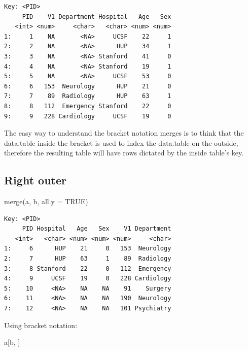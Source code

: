 \documentclass[
]{book}
\newenvironment{Shaded}{\begin{snugshade}}{\end{snugshade}}
\newcommand{\AttributeTok}[1]{\textcolor[rgb]{0.77,0.63,0.00}{#1}}
\newcommand{\ConstantTok}[1]{\textcolor[rgb]{0.00,0.00,0.00}{#1}}
\newcommand{\FunctionTok}[1]{\textcolor[rgb]{0.00,0.00,0.00}{#1}}
\newcommand{\NormalTok}[1]{#1}
\begin{document}
\begin{verbatim}
Key: <PID>
     PID    V1 Department Hospital   Age   Sex
   <int> <num>     <char>   <char> <num> <num>
1:     1    NA       <NA>     UCSF    22     1
2:     2    NA       <NA>      HUP    34     1
3:     3    NA       <NA> Stanford    41     0
4:     4    NA       <NA> Stanford    19     1
5:     5    NA       <NA>     UCSF    53     0
6:     6   153  Neurology      HUP    21     0
7:     7    89  Radiology      HUP    63     1
8:     8   112  Emergency Stanford    22     0
9:     9   228 Cardiology     UCSF    19     0
\end{verbatim}

\begin{rmdnote}
The easy way to understand the bracket notation merges is to think that
the data.table inside the bracket is used to index the data.table on the
outside, therefore the resulting table will have rows dictated by the
inside table's key.
\end{rmdnote}

\hypertarget{right-outer}{%
\subsection{Right outer}\label{right-outer}}

\begin{Shaded}
\begin{Highlighting}[]
\FunctionTok{merge}\NormalTok{(a, b, }\AttributeTok{all.y =} \ConstantTok{TRUE}\NormalTok{)}
\end{Highlighting}
\end{Shaded}

\begin{verbatim}
Key: <PID>
     PID Hospital   Age   Sex    V1 Department
   <int>   <char> <num> <num> <num>     <char>
1:     6      HUP    21     0   153  Neurology
2:     7      HUP    63     1    89  Radiology
3:     8 Stanford    22     0   112  Emergency
4:     9     UCSF    19     0   228 Cardiology
5:    10     <NA>    NA    NA    91    Surgery
6:    11     <NA>    NA    NA   190  Neurology
7:    12     <NA>    NA    NA   101 Psychiatry
\end{verbatim}

Using bracket notation:

\begin{Shaded}
\begin{Highlighting}[]
\NormalTok{a[b, ]}
\end{Highlighting}
\end{Shaded}
\end{document}
